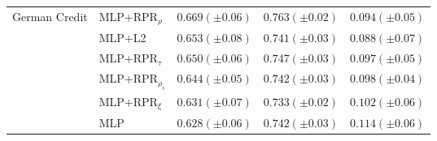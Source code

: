 \begin{tabular}{lllll}
\multirow[t]{6}{*}{German Credit} & MLP+RPR$_{\rho}$ & $0.669 (\pm0.06)$ & $0.763 (\pm0.02)$ & $0.094 (\pm0.05)$ \\
 & MLP+L2 & $0.653 (\pm0.08)$ & $0.741 (\pm0.03)$ & $0.088 (\pm0.07)$ \\
 & MLP+RPR$_{\tau}$ & $0.650 (\pm0.06)$ & $0.747 (\pm0.03)$ & $0.097 (\pm0.05)$ \\
 & MLP+RPR$_{\rho_s}$ & $0.644 (\pm0.05)$ & $0.742 (\pm0.03)$ & $0.098 (\pm0.04)$ \\
 & MLP+RPR$_{\xi}$ & $0.631 (\pm0.07)$ & $0.733 (\pm0.02)$ & $0.102 (\pm0.06)$ \\
 & MLP & $0.628 (\pm0.06)$ & $0.742 (\pm0.03)$ & $0.114 (\pm0.06)$ \\
\cline{1-5}
\bottomrule
\end{tabular}
